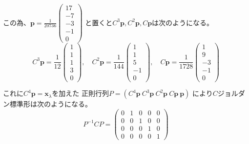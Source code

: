 \documentclass[12pt,b5paper]{ltjsarticle}
\begin{document}
\begin{enumerate}
      この為、$\bm{p}=\frac{1}{20736}\begin{pmatrix}17\\-7\\-3\\-1\\0\end{pmatrix}$
      と置くと$C^3\bm{p},C^2\bm{p},C\bm{p}$は次のようになる。
      \begin{equation}
       C^3\bm{p}=\frac{1}{12}\begin{pmatrix}1\\1\\1\\3\\0\end{pmatrix}
       ,\quad
       C^2\bm{p}=\frac{1}{144}\begin{pmatrix}1\\1\\5\\-1\\0\end{pmatrix}
       ,\quad
       C\bm{p}=\frac{1}{1728}\begin{pmatrix}1\\9\\-3\\-1\\0\end{pmatrix}
      \end{equation}


      これに$C^4\bm{p}=\bm{x}_\lambda$を加えた
      正則行列$P=(C^4\bm{p} \ C^3\bm{p} \ C^2\bm{p} \ C\bm{p} \ \bm{p})$
      により$C$ジョルダン標準形は次のようになる。
      \begin{equation}
       P^{-1}CP=
        \begin{pmatrix}0&1&0&0&0\\0&0&1&0&0\\0&0&0&1&0\\0&0&0&0&1\end{pmatrix}
      \end{equation}




\hrulefill

\end{enumerate}






\hrulefill
\end{document}

